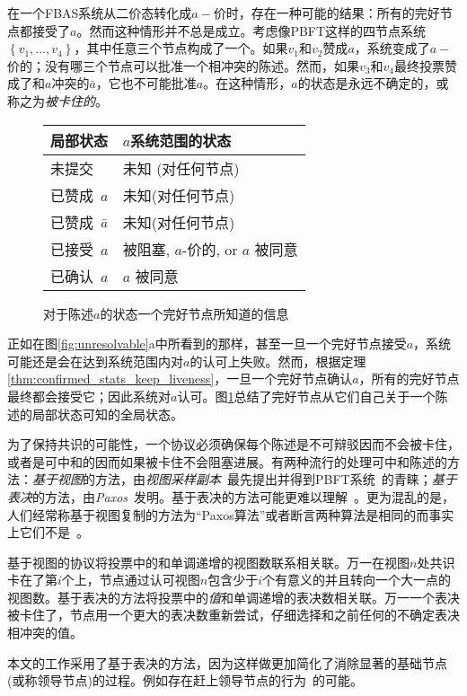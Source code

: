 在一个FBAS系统从二价态转化成$a-\!\!$价时，存在一种可能的结果：所有的完好节点都接受了$a$。然而这种情形并不总是成立。考虑像PBFT这样的四节点系统$\left\{v_1,\ldots,v_4\right\}$，其中任意三个节点构成了一个{\quorum}。如果$v_1$和$v_2$赞成$a$，系统变成了$a-\!\!$价的；没有哪三个节点可以批准一个相冲突的陈述。然而，如果$v_3$和$v_4$最终投票赞成了和$a$冲突的$\bar a$，它也不可能批准$a$。在这种情形，$a$的状态是永远不确定的，或称之为\textit{被卡住的}。

\begin{figure}
\centering 
{}
\begin{tabu} to .85\textwidth{ll}\toprule
\rowfont\bfseries 局部状态 & $a$系统范围的状态\\
\midrule
未提交 & 未知 (对任何节点) \\
已赞成~$a$ & 未知(对任何节点) \\
已赞成~$\bar a$ & 未知(对任何节点) \\
已接受~$a$ & 被阻塞, $a$-价的, or $a$ 被同意 \\
已确认~$a$ & $a$ 被同意 \\
\bottomrule
\end{tabu}
\caption{对于陈述$a$的状态一个完好节点所知道的信息}
\label{fig:localglobal}
\end{figure}

正如在{图\ref{fig:unresolvable}a}中所看到的那样，甚至一旦一个完好节点接受$a$，系统可能还是会在达到系统范围内对$a$的认可上失败。然而，根据定理\ref{thm:confirmed_stats_keep_liveness}，一旦一个完好节点确认$a$，所有的完好节点最终都会接受它；因此系统对$a$认可。{图\ref{fig:localglobal}}总结了完好节点从它们自己关于一个陈述的局部状态可知的全局状态。

为了保持共识的可能性，一个协议必须确保每个陈述是不可辩驳因而不会被卡住，或者是可中和的因而如果被卡住不会阻塞进展。有两种流行的处理可中和陈述的方法：\textit{基于视图}的方法，由\textit{视图采样副本}~\cite{Oki:1988:VRN:62546.62549}最先提出并得到PBFT系统~\cite{Castro:1999:PBFT}的青睐；\textit{基于表决}的方法，由\textit{Paxos}~\cite{Lamport:1998:PP:279227.279229}发明。基于表决的方法可能更难以理解~\cite{Ongaro:2014:SUC:2643634.2643666}。更为混乱的是，人们经常称基于视图复制的方法为``Paxos算法''或者断言两种算法是相同的而事实上它们不是~\cite{6894199}。

基于视图的协议将投票中的{\slot}和单调递增的视图数联系相关联。万一在视图$n$处共识卡在了第$i$个{\slot}上，节点通过认可视图$n$包含少于$i$个有意义的{\slot}并且转向一个大一点的视图数。基于表决的方法将投票中的\textit{值}和单调递增的表决数相关联。万一一个表决被卡住了，节点用一个更大的表决数重新尝试，仔细选择和之前任何的不确定表决相冲突的值。

本文的工作采用了基于表决的方法，因为这样做更加简化了消除显著的基础节点(或称领导节点)的过程。例如存在赶上领导节点的行为~\cite{Lamport:2011:BPR:2075029.2075058}的可能。
